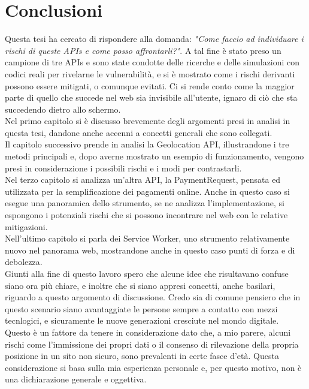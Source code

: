 \documentclass[12pt ,a4paper , twoside , openright ]{book}
\begin{document}
	\chapter{Conclusioni}
	Questa tesi ha cercato di rispondere alla domanda: \textit{"Come faccio ad individuare i rischi di queste APIs e come posso affrontarli?"}. A tal fine è stato preso un campione di tre APIs e sono state condotte delle ricerche e delle simulazioni con codici reali per rivelarne le vulnerabilità, e si è mostrato come i rischi derivanti possono essere mitigati, o comunque evitati. Ci si rende conto come la maggior parte di quello che succede nel web sia invisibile all'utente, ignaro di ciò che sta succedendo dietro allo schermo. \\
	Nel primo capitolo si è discusso brevemente degli argomenti presi in analisi in questa tesi, dandone anche accenni a concetti generali che sono collegati. \\
	Il capitolo successivo prende in analisi la Geolocation API, illustrandone i tre metodi principali e, dopo averne mostrato un esempio di funzionamento, vengono presi in considerazione i possibili rischi e i modi per contrastarli. \\
	Nel terzo capitolo si analizza un'altra API, la PaymentRequest, pensata ed utilizzata per la semplificazione dei pagamenti online. Anche in questo caso si esegue una panoramica dello strumento, se ne analizza l'implementazione, si espongono i potenziali rischi che si possono incontrare nel web con le relative mitigazioni. \\
	Nell'ultimo capitolo si parla dei Service Worker, uno strumento relativamente nuovo nel panorama web, mostrandone anche in questo caso punti di forza e di debolezza. \\
	Giunti alla fine di questo lavoro spero che alcune idee che risultavano confuse siano ora più chiare, e inoltre che si siano appresi concetti, anche basilari, riguardo a questo argomento di discussione. Credo sia di comune pensiero che in questo scenario siano avantaggiate le persone sempre a contatto con mezzi tecnlogici, e sicuramente le nuove generazioni cresciute nel mondo digitale. Questo è un fattore da tenere in considerazione dato che, a mio parere, alcuni rischi come l'immissione dei propri dati o il consenso di rilevazione della propria posizione in un sito non sicuro, sono prevalenti in certe fasce d'età. Questa considerazione si basa sulla mia esperienza personale e, per questo motivo, non è una dichiarazione generale e oggettiva. \\
\end{document}
